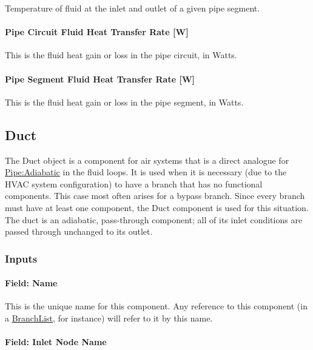 Temperature of fluid at the inlet and outlet of a given pipe segment.

\paragraph{Pipe Circuit Fluid Heat Transfer Rate {[}W{]}}\label{pipe-circuit-fluid-heat-transfer-rate-w}

This is the fluid heat gain or loss in the pipe circuit, in Watts.

\paragraph{Pipe Segment Fluid Heat Transfer Rate {[}W{]}}\label{pipe-segment-fluid-heat-transfer-rate-w}

This is the fluid heat gain or loss in the pipe segment, in Watts.

\subsection{Duct}\label{duct}

The Duct object is a component for air systems that is a direct analogue for \hyperref[pipeadiabatic]{Pipe:Adiabatic} in the fluid loops. It is used when it is necessary (due to the HVAC system configuration) to have a branch that has no functional components. This case most often arises for a bypass branch. Since every branch must have at least one component, the Duct component is used for this situation. The duct is an adiabatic, pass-through component; all of its inlet conditions are passed through unchanged to its outlet.

\subsubsection{Inputs}\label{inputs-12-009}

\paragraph{Field: Name}\label{field-name-12-006}

This is the unique name for this component. Any reference to this component (in a \hyperref[branchlist]{BranchList}, for instance) will refer to it by this name.

\paragraph{Field: Inlet Node Name}\label{field-inlet-node-name-2-000}

